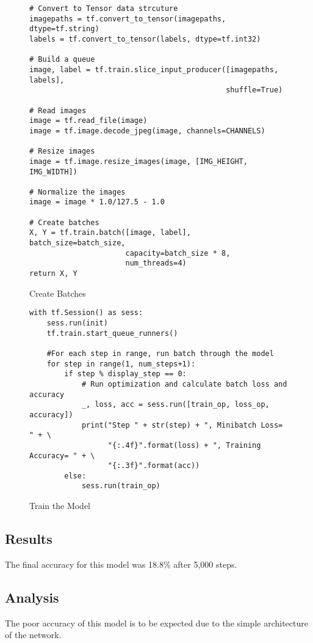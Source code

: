 \begin{figure}[h]
\caption{Create Batches \parencite{file_dir_code}}
\label{lst:createBatches}
\begin{lstlisting}[style=Python]
# Convert to Tensor data strcuture
imagepaths = tf.convert_to_tensor(imagepaths, dtype=tf.string)
labels = tf.convert_to_tensor(labels, dtype=tf.int32)

# Build a queue
image, label = tf.train.slice_input_producer([imagepaths, labels],
                                             shuffle=True)

# Read images
image = tf.read_file(image)
image = tf.image.decode_jpeg(image, channels=CHANNELS)

# Resize images
image = tf.image.resize_images(image, [IMG_HEIGHT, IMG_WIDTH])

# Normalize the images
image = image * 1.0/127.5 - 1.0

# Create batches
X, Y = tf.train.batch([image, label], batch_size=batch_size,
                      capacity=batch_size * 8,
                      num_threads=4)
return X, Y
\end{lstlisting}
\end{figure}

\begin{figure}[h]
\caption{Train the Model \parencite{file_dir_code}}
\label{lst:trainModel3}
\begin{lstlisting}[style=Python]
with tf.Session() as sess:
    sess.run(init)
    tf.train.start_queue_runners()

    #For each step in range, run batch through the model
    for step in range(1, num_steps+1):
        if step % display_step == 0:
            # Run optimization and calculate batch loss and accuracy
            _, loss, acc = sess.run([train_op, loss_op, accuracy])
            print("Step " + str(step) + ", Minibatch Loss= " + \
                  "{:.4f}".format(loss) + ", Training Accuracy= " + \
                  "{:.3f}".format(acc))
        else:
            sess.run(train_op)
\end{lstlisting}
\end{figure}

\tocless\subsection{Results}
The final accuracy for this model was 18.8\% after 5,000 steps.

\tocless\subsection{Analysis}
The poor accuracy of this model is to be expected due to the simple architecture of the network.

\clearpage